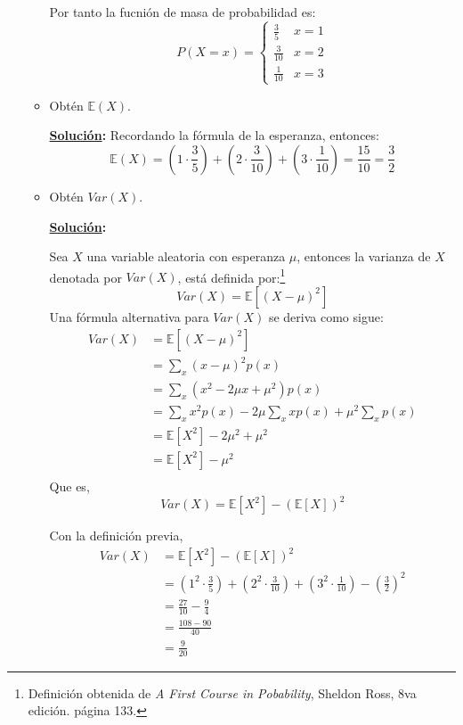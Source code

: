 \documentclass[11pt,letterpaper]{report}
\newcommand{\sol}{\textbf{\underline{Solución}: }} %
\begin{document}
\begin{enumerate}
\begin{itemize}
    Por tanto la fucnión de masa de probabilidad es:
    \[
        P(X=x) =
            \begin{cases}
                \frac{3}{5} & x=1\\
                \frac{3}{10} & x=2\\
                \frac{1}{10} & x=3
            \end{cases}
    \]
    
    \item Obtén $\mathds{E}(X)$.
    
    \sol Recordando la fórmula de la esperanza, entonces:
    \[
        \mathds{E}(X) = (1 \cdot \frac{3}{5}) + (2 \cdot \frac{3}{10}) + (3 \cdot \frac{1}{10}) =
        \frac{15}{10} = \frac{3}{2}
    \]

    \item Obtén $Var(X)$.
    
    \sol
    \begin{definition}
        Sea $X$ una variable aleatoria con esperanza $\mu$, entonces la varianza de $X$ denotada por
        $Var(X)$, está definida por:\footnote{Definición obtenida de \emph{A First
        Course in Pobability}, Sheldon Ross, 8va edición. página 133.}
        $$  Var(X) = \mathds{E}[(X - \mu)^2]    $$
        Una fórmula alternativa para $Var(X)$ se deriva como sigue:
        \begin{align*}
            Var(X)
                &= \mathds{E}[(X - \mu)^2]\\
                &= \sum_{x} (x - \mu)^2 p(x)\\
                &= \sum_{x} (x^2 - 2\mu x + \mu^2) p(x)\\
                &= \sum_{x} x^2p(x) - 2\mu \sum_{x} x p(x) + \mu^2 \sum_{x} p(x)\\
                &= \mathds{E}[X^2] - 2\mu^2 + \mu^2\\
                &= \mathds{E}[X^2] - \mu^2\\
        \end{align*}
        Que es,
        \[
            Var(X) = \mathds{E}[X^2] - (\mathds{E}[X])^2
        \]
    \end{definition}

    Con la definición previa,
    \begin{align*}
        Var(X) &= \mathds{E}[X^2] - (\mathds{E}[X])^2\\
            &= (1^2 \cdot \frac{3}{5}) + (2^2 \cdot \frac{3}{10}) + (3^2 \cdot \frac{1}{10}) - (\frac{3}{2})^2\\
            &= \frac{27}{10} - \frac{9}{4}\\
            &= \frac{108-90}{40}\\
            &= \frac{9}{20}
    \end{align*}
\end{itemize}


\end{enumerate}
\end{document}
